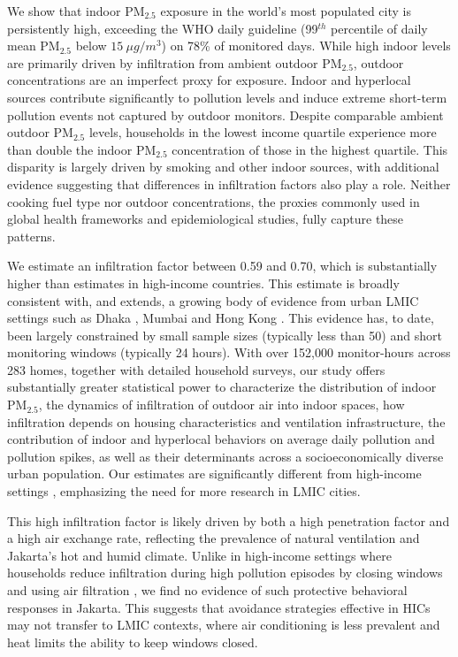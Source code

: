\documentclass[9pt,twocolumn,twoside]{pnas-new}
\begin{document}
We show that indoor PM$_{2.5}$ exposure in the world's most populated city is persistently high, exceeding the WHO daily guideline (99$^{th}$ percentile of daily mean PM$_{2.5}$ below $15~\mu g/m^3$) on 78\% of monitored days. While high indoor levels are primarily driven by infiltration from ambient outdoor PM$_{2.5}$, outdoor concentrations are an imperfect proxy for exposure. Indoor and hyperlocal sources contribute significantly to pollution levels and induce extreme short-term pollution events not captured by outdoor monitors. Despite comparable ambient outdoor PM$_{2.5}$ levels, households in the lowest income quartile experience more than double the indoor PM$_{2.5}$ concentration of those in the highest quartile. This disparity is largely driven by smoking and other indoor sources, with additional evidence suggesting that differences in infiltration factors also play a role. Neither cooking fuel type nor outdoor concentrations, the proxies commonly used in global health frameworks and epidemiological studies, fully capture these patterns.

We estimate an infiltration factor between 0.59 and 0.70, which is substantially higher than estimates in high-income countries.
This estimate is broadly consistent with, and extends, a growing body of evidence from urban LMIC settings such as Dhaka \citep{Sahaetal2025}, Mumbai \citep{Anandetal2022} and Hong Kong \citep{Hossainetal2021}. This evidence has, to date, been largely constrained by small sample sizes (typically less than 50) and short monitoring windows (typically 24 hours). 
With over 152,000 monitor-hours across 283 homes, together with detailed household surveys, our study offers substantially greater statistical power to characterize the distribution of indoor PM$_{2.5}$, the dynamics of infiltration of outdoor air into indoor spaces, how infiltration depends on housing characteristics and ventilation infrastructure, the contribution of indoor and hyperlocal behaviors on average daily pollution and pollution spikes, as well as their determinants across a socioeconomically diverse urban population. Our estimates are significantly different from high-income settings \citep{krebs_using_2021, lunderberg_assessing_2023, burke_exposures_2022}, emphasizing the need for more research in LMIC cities.

This high infiltration factor is likely driven by both a high penetration factor and a high air exchange rate, reflecting the prevalence of natural ventilation and Jakarta's hot and humid climate. Unlike in high-income settings where households reduce infiltration during high pollution episodes by closing windows and using air filtration \citep{burke_exposures_2022}, we find no evidence of such protective behavioral responses in Jakarta. This suggests that avoidance strategies effective in HICs may not transfer to LMIC contexts, where air conditioning is less prevalent and heat limits the ability to keep windows closed.
\end{document}

